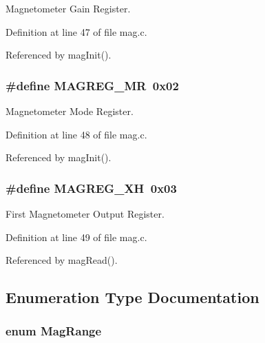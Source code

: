 Magnetometer Gain Register. 



Definition at line 47 of file mag.\-c.



Referenced by mag\-Init().

\hypertarget{group__mag_ga54eabf3b296f6550c9f6d9826020c623}{
\subsubsection[{M\-A\-G\-R\-E\-G\-\_\-\-M\-R}]{\setlength{\rightskip}{0pt plus 5cm}\#define M\-A\-G\-R\-E\-G\-\_\-\-M\-R~0x02}}\label{group__mag_ga54eabf3b296f6550c9f6d9826020c623}


Magnetometer Mode Register. 



Definition at line 48 of file mag.\-c.



Referenced by mag\-Init().

\hypertarget{group__mag_ga84e94fce89f9ba26ff3f33621c3a63bd}{
\subsubsection[{M\-A\-G\-R\-E\-G\-\_\-\-X\-H}]{\setlength{\rightskip}{0pt plus 5cm}\#define M\-A\-G\-R\-E\-G\-\_\-\-X\-H~0x03}}\label{group__mag_ga84e94fce89f9ba26ff3f33621c3a63bd}


First Magnetometer Output Register. 



Definition at line 49 of file mag.\-c.



Referenced by mag\-Read().



\subsection{Enumeration Type Documentation}
\hypertarget{group__mag_ga3af649d913d146d6654db2354d88c18a}{
\subsubsection[{Mag\-Range}]{\setlength{\rightskip}{0pt plus 5cm}enum {\bf Mag\-Range}}}\label{group__mag_ga3af649d913d146d6654db2354d88c18a}


